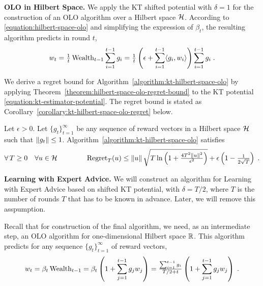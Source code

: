 \noindent\textbf{OLO in Hilbert Space.}
We apply the KT shifted potential with $\delta=1$ for the construction of an OLO algorithm over a Hilbert
space $\mathcal{H}$. According to \eqref{equation:hilbert-space-olo} and simplifying the expression of $\beta_t$, the resulting algorithm predicts in round $t$,
$$
w_t
= \tfrac{1}{t} \operatorname{Wealth}_{t-1} \sum_{i=1}^{t-1} g_i
= \tfrac{1}{t} \left(\epsilon + \sum_{i=1}^{t-1} \langle g_i, w_i \rangle \right) \sum_{i=1}^{t-1} g_i \; .
$$

We derive a regret bound for Algorithm~\ref{algorithm:kt-hilbert-space-olo} by
applying Theorem~\ref{theorem:hilbert-space-olo-regret-bound} to the KT
potential \eqref{equation:kt-estimator-potential}. The regret bound is stated as
Corollary~\ref{corollary:kt-hilbert-space-olo-regret} below.

\begin{corollary}
\label{corollary:kt-hilbert-space-olo-regret}
Let $\epsilon > 0$. Let $\{g_t\}_{t=1}^\infty$ be any sequence of reward vectors
in a Hilbert space $\mathcal{H}$ such that $\left\|{g_t}\right\| \le 1$.
Algorithm~\ref{algorithm:kt-hilbert-space-olo} satisfies
$$
\forall \, T \ge 0 \quad
\forall u \in \mathcal{H} \qquad \qquad
\operatorname{Regret}_T(u) \le \left\|{u}\right\| \sqrt{T \ln\left(1 + \tfrac{4T^2 \left\|{u}\right\|^2}{\epsilon^2} \right)} + \epsilon \left(1 - \tfrac{1}{2\sqrt{T}} \right) \;.
$$
\end{corollary}

\noindent\textbf{Learning with Expert Advice.}
We will construct an algorithm for Learning with Expert Advice based on
shifted KT potential, with $\delta=T/2$, where $T$ is the number of rounds $T$ that has to be known in advance. Later, we will remove this asspumption.

Recall that for construction of the final algorithm, we need, as an intermediate
step, an OLO algorithm for one-dimensional Hilbert space $\mathbb{R}$. This algorithm
predicts for any sequence $\{g_t\}_{t=1}^\infty$ of reward vectors,
$$
w_t
= \beta_t \operatorname{Wealth}_{t-1}
= \beta_t \left(1 + \sum_{j=1}^{t-1} g_j w_j \right)
= \tfrac{\sum_{i=1}^{t-1} g_i}{T/2+t} \left(1 + \sum_{j=1}^{t-1} g_j w_j \right) \; .
$$

